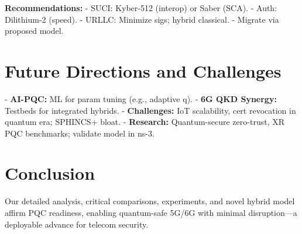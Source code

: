 \documentclass[11pt,a4paper]{article}
\begin{document}
\begin{mdframed}
\textbf{Recommendations:}
- SUCI: Kyber-512 (interop) or Saber (SCA).
- Auth: Dilithium-2 (speed).
- URLLC: Minimize sigs; hybrid classical.
- Migrate via proposed model.
\end{mdframed}

\section{Future Directions and Challenges}

- \textbf{AI-PQC:} ML for param tuning (e.g., adaptive q).
- \textbf{6G QKD Synergy:} Testbeds for integrated hybrids.
- \textbf{Challenges:} IoT scalability, cert revocation in quantum era; SPHINCS+ bloat.
- \textbf{Research:} Quantum-secure zero-trust, XR PQC benchmarks; validate model in ns-3.

\section{Conclusion}

Our detailed analysis, critical comparisons, experiments, and novel hybrid model affirm PQC readiness, enabling quantum-safe 5G/6G with minimal disruption---a deployable advance for telecom security.
\end{document}
